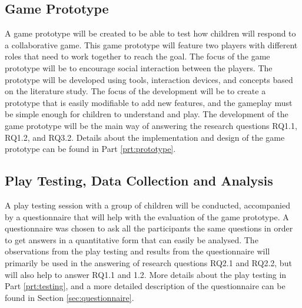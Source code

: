\subsection{Game Prototype}
A game prototype will be created to be able to test how children will respond to a collaborative game. This game prototype will feature two players with different roles that need to work together to reach the goal. The focus of the game prototype will be to encourage social interaction between the players. The prototype will be developed using tools, interaction devices, and concepts based on the literature study. The focus of the development will be to create a prototype that is easily modifiable to add new features, and the gameplay must be simple enough for children to understand and play. The development of the game prototype will be the main way of answering the research questions RQ1.1, RQ1.2, and RQ3.2. Details about the implementation and design of the game prototype can be found in Part \ref{prt:prototype}.

\subsection{Play Testing, Data Collection and Analysis}
A play testing session with a group of children will be conducted, accompanied by a questionnaire that will help with the evaluation of the game prototype. A questionnaire was chosen to ask all the participants the same questions in order to get answers in a quantitative form that can easily be analysed. The observations from the play testing and results from the questionnaire will primarily be used in the answering of research questions RQ2.1 and RQ2.2, but will also help to answer RQ1.1 and 1.2. More details about the play testing in Part \ref{prt:testing}, and a more detailed description of the questionnaire can be found in Section \ref{sec:questionnaire}.



